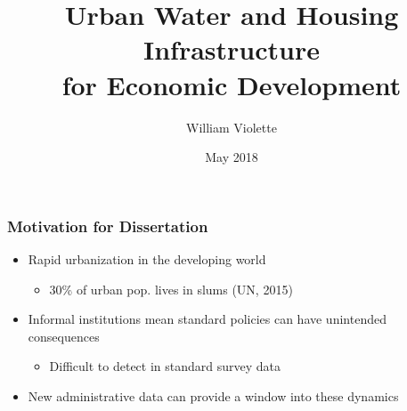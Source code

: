 \documentclass[aspectratio=149]{beamer}
\title{Urban Water and Housing Infrastructure  \\ for Economic Development} %
\author{William Violette}
\date{May 2018} %
\begin{document}
\beamertemplatenavigationsymbolsempty

\begin{frame}
\titlepage %
\end{frame}




%



\begin{frame}
\frametitle{Motivation for Dissertation}
\begin{itemize}
  \item Rapid urbanization in the developing world
    \begin{itemize}
      \item  30\% of urban pop. lives in slums (UN, 2015)
    \end{itemize}
\vspace{.2cm}
  \item Informal institutions mean standard policies can have unintended consequences
  \begin{itemize}
    \item Difficult to detect in standard survey data
  \end{itemize}
\vspace{.2cm}
  \item New administrative data can provide a window into these dynamics
\end{itemize}
\end{frame}
\end{document}
